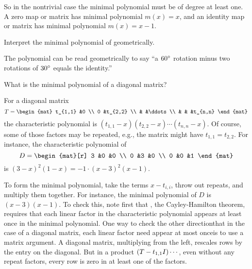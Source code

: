 \begin{exercises}
\begin{answer}
         So in the nontrivial case the minimal polynomial must be of degree
         at least one.
         A zero map or matrix has minimal polynomial \( m(x)=x \), and an
         identity map or matrix has minimal polynomial \( m(x)=x-1 \). 
       \end{answer}
  \recommended \item 
     Interpret the minimal polynomial of 
      geometrically.
     \begin{answer}
       The polynomial can be read geometrically to say ``a \( 60^\circ\relax \)
       rotation minus two rotations of \( 30^\circ\relax \) equals the
       identity.''
     \end{answer}
   \item 
     What is the minimal polynomial of a diagonal matrix?
     \begin{answer}
       For a diagonal matrix
       \begin{equation*}
          T=
          \begin{mat}
             t_{1,1}   &0        \\
             0         &t_{2,2}  \\
                       &        &\ddots  \\
                       &        &      &t_{n,n}
          \end{mat}
       \end{equation*}
       the characteristic polynomial is 
       $(t_{1,1}-x)(t_{2,2}-x)\cdots (t_{n,n}-x)$.     
       Of course, some of those factors may be repeated, e.g., the matrix might
       have $t_{1,1}=t_{2,2}$.
       For instance, the characteristic polynomial of
       \begin{equation*}
          D=
          \begin{mat}[r]
             3 &0 &0  \\
             0 &3 &0  \\
             0 &0 &1
          \end{mat}
       \end{equation*}
       is \( (3-x)^2(1-x)=-1\cdot (x-3)^2(x-1) \). 

       To form the minimal polynomial, 
       take the terms \( x-t_{i,i} \), throw out repeats, 
       and multiply them together.
       For instance, the minimal polynomial of $D$
       is \( (x-3)(x-1) \).
       To check this, note first that , 
       the Cayley-Hamilton theorem, requires that each linear factor in the
       characteristic polynomial appears at least once in the minimal
       polynomial.
       One way to check the other direction\Dash that in the case of
       a diagonal matrix, 
       each linear factor need appear at most once\Dash is to
       use a matrix argument.
       A diagonal matrix, multiplying from the left, rescales rows by
       the entry on the diagonal.
       But in a product $(T-t_{1,1}I)\cdots\hbox{}$, even without any repeat
       factors, every row is zero in at least one of the factors. 


\end{answer}
\end{exercises}
